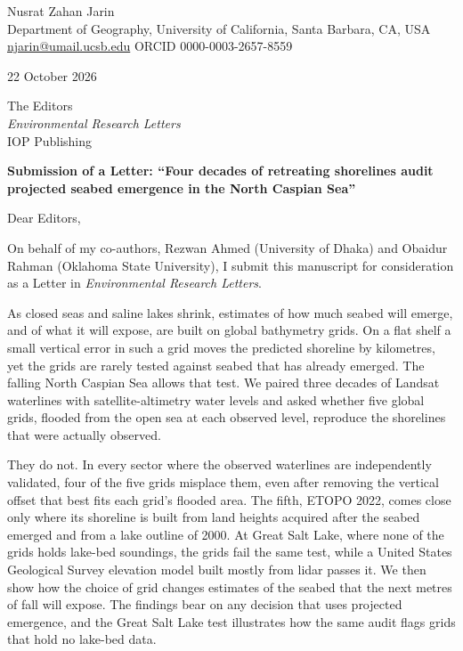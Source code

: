 \documentclass[11pt,a4paper]{article}
\begin{document}
Nusrat Zahan Jarin\\
Department of Geography, University of California, Santa Barbara, CA, USA\\
\href{mailto:njarin@umail.ucsb.edu}{njarin@umail.ucsb.edu} \textbar{} ORCID 0000-0003-2657-8559

22 October 2026

The Editors\\
\emph{Environmental Research Letters}\\
IOP Publishing

\textbf{Submission of a Letter: ``Four decades of retreating shorelines audit projected seabed emergence in the North Caspian Sea''}

Dear Editors,

On behalf of my co-authors, Rezwan Ahmed (University of Dhaka) and Obaidur Rahman (Oklahoma State University), I submit this manuscript for consideration as a Letter in \emph{Environmental Research Letters}.

As closed seas and saline lakes shrink, estimates of how much seabed will emerge, and of what it will expose, are built on global bathymetry grids. On a flat shelf a small vertical error in such a grid moves the predicted shoreline by kilometres, yet the grids are rarely tested against seabed that has already emerged. The falling North Caspian Sea allows that test. We paired three decades of Landsat waterlines with satellite-altimetry water levels and asked whether five global grids, flooded from the open sea at each observed level, reproduce the shorelines that were actually observed.

They do not. In every sector where the observed waterlines are independently validated, four of the five grids misplace them, even after removing the vertical offset that best fits each grid's flooded area. The fifth, ETOPO 2022, comes close only where its shoreline is built from land heights acquired after the seabed emerged and from a lake outline of 2000. At Great Salt Lake, where none of the grids holds lake-bed soundings, the grids fail the same test, while a United States Geological Survey elevation model built mostly from lidar passes it. We then show how the choice of grid changes estimates of the seabed that the next metres of fall will expose. The findings bear on any decision that uses projected emergence, and the Great Salt Lake test illustrates how the same audit flags grids that hold no lake-bed data.
\end{document}
